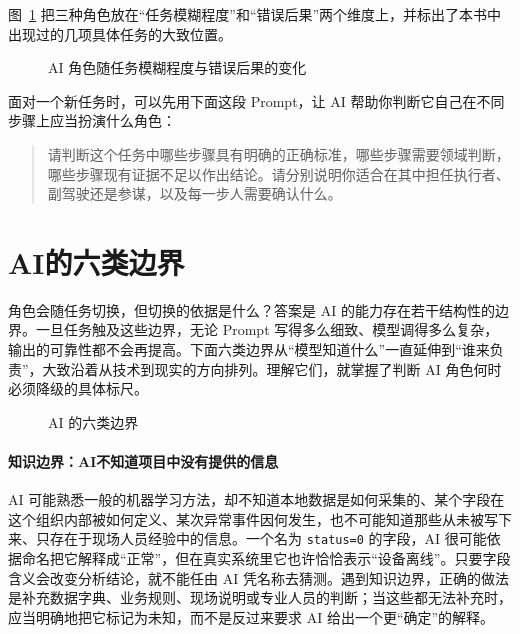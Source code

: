 图~\ref{fig:ch14_roles} 把三种角色放在“任务模糊程度”和“错误后果”两个维度上，并标出了本书中出现过的几项具体任务的大致位置。

\begin{figure}[H]
  \centering
  \caption{AI 角色随任务模糊程度与错误后果的变化}
  \label{fig:ch14_roles}
\end{figure}

面对一个新任务时，可以先用下面这段 Prompt，让 AI 帮助你判断它自己在不同步骤上应当扮演什么角色：

\begin{quote}
请判断这个任务中哪些步骤具有明确的正确标准，哪些步骤需要领域判断，哪些步骤现有证据不足以作出结论。请分别说明你适合在其中担任执行者、副驾驶还是参谋，以及每一步人需要确认什么。
\end{quote}

\section{AI的六类边界}

角色会随任务切换，但切换的依据是什么？答案是 AI 的能力存在若干结构性的边界。一旦任务触及这些边界，无论 Prompt 写得多么细致、模型调得多么复杂，输出的可靠性都不会再提高。下面六类边界从“模型知道什么”一直延伸到“谁来负责”，大致沿着从技术到现实的方向排列。理解它们，就掌握了判断 AI 角色何时必须降级的具体标尺。

\begin{figure}[H]
  \centering
  \caption{AI 的六类边界}
  \label{fig:ch14_six}
\end{figure}

\paragraph{知识边界：AI不知道项目中没有提供的信息}
AI 可能熟悉一般的机器学习方法，却不知道本地数据是如何采集的、某个字段在这个组织内部被如何定义、某次异常事件因何发生，也不可能知道那些从未被写下来、只存在于现场人员经验中的信息。一个名为 \texttt{status=0} 的字段，AI 很可能依据命名把它解释成“正常”，但在真实系统里它也许恰恰表示“设备离线”。只要字段含义会改变分析结论，就不能任由 AI 凭名称去猜测。遇到知识边界，正确的做法是补充数据字典、业务规则、现场说明或专业人员的判断；当这些都无法补充时，应当明确地把它标记为未知，而不是反过来要求 AI 给出一个更“确定”的解释。

